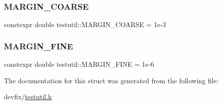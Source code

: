 \subsubsection{\texorpdfstring{M\+A\+R\+G\+I\+N\+\_\+\+C\+O\+A\+R\+SE}{MARGIN\_COARSE}}
{\footnotesize\ttfamily constexpr double testutil\+::\+M\+A\+R\+G\+I\+N\+\_\+\+C\+O\+A\+R\+SE = 1e-\/3\hspace{0.3cm}{\ttfamily [static]}}

\mbox{\label{structtestutil_a7a42df59c058fb72e784d1e4420ff392}} 
\subsubsection{\texorpdfstring{M\+A\+R\+G\+I\+N\+\_\+\+F\+I\+NE}{MARGIN\_FINE}}
{\footnotesize\ttfamily constexpr double testutil\+::\+M\+A\+R\+G\+I\+N\+\_\+\+F\+I\+NE = 1e-\/6\hspace{0.3cm}{\ttfamily [static]}}



The documentation for this struct was generated from the following file\+:\begin{DoxyCompactItemize}
\item 
devfix/\hyperlink{testutil_8h}{testutil.\+h}\end{DoxyCompactItemize}
